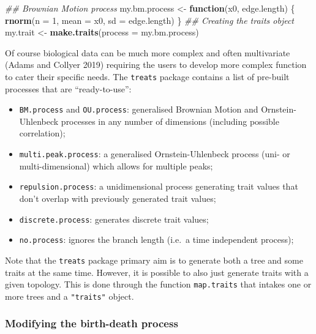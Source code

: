 \documentclass[
]{article}
\newenvironment{Shaded}{\begin{snugshade}}{\end{snugshade}}
\newcommand{\CommentTok}[1]{\textcolor[rgb]{0.56,0.35,0.01}{\textit{#1}}}
\newcommand{\ControlFlowTok}[1]{\textcolor[rgb]{0.13,0.29,0.53}{\textbf{#1}}}
\newcommand{\DataTypeTok}[1]{\textcolor[rgb]{0.13,0.29,0.53}{#1}}
\newcommand{\DecValTok}[1]{\textcolor[rgb]{0.00,0.00,0.81}{#1}}
\newcommand{\KeywordTok}[1]{\textcolor[rgb]{0.13,0.29,0.53}{\textbf{#1}}}
\newcommand{\NormalTok}[1]{#1}
\newcommand{\StringTok}[1]{\textcolor[rgb]{0.31,0.60,0.02}{#1}}
\providecommand{\tightlist}{%
  \setlength{\itemsep}{0pt}\setlength{\parskip}{0pt}}
\begin{document}
\begin{Shaded}
\begin{Highlighting}[]
\CommentTok{\#\# Brownian Motion process}
\NormalTok{my.bm.process \textless{}{-}}\StringTok{ }\ControlFlowTok{function}\NormalTok{(x0, edge.length) \{}
    \KeywordTok{rnorm}\NormalTok{(}\DataTypeTok{n =} \DecValTok{1}\NormalTok{, }\DataTypeTok{mean =}\NormalTok{ x0, }\DataTypeTok{sd =}\NormalTok{ edge.length)}
\NormalTok{\} }
\CommentTok{\#\# Creating the traits object}
\NormalTok{my.trait \textless{}{-}}\StringTok{ }\KeywordTok{make.traits}\NormalTok{(}\DataTypeTok{process =}\NormalTok{ my.bm.process)}
\end{Highlighting}
\end{Shaded}

Of course biological data can be much more complex and often
multivariate (Adams and Collyer 2019) requiring the users to develop
more complex function to cater their specific needs. The \texttt{treats}
package contains a list of pre-built processes that are
``ready-to-use'':

\begin{itemize}
\tightlist
\item
  \texttt{BM.process} and \texttt{OU.process}: generalised Brownian
  Motion and Ornstein-Uhlenbeck processes in any number of dimensions
  (including possible correlation);
\item
  \texttt{multi.peak.process}: a generalised Ornstein-Uhlenbeck process
  (uni- or multi-dimensional) which allows for multiple peaks;
\item
  \texttt{repulsion.process}: a unidimensional process generating trait
  values that don't overlap with previously generated trait values;
\item
  \texttt{discrete.process}: generates discrete trait values;
\item
  \texttt{no.process}: ignores the branch length (i.e.~a time
  independent process);
\end{itemize}

Note that the \texttt{treats} package primary aim is to generate both a
tree and some traits at the same time. However, it is possible to also
just generate traits with a given topology. This is done through the
function \texttt{map.traits} that intakes one or more trees and a
\texttt{"traits"} object.

\hypertarget{modifying-the-birth-death-process}{%
\subsubsection{Modifying the birth-death
process}\label{modifying-the-birth-death-process}}
\end{document}
